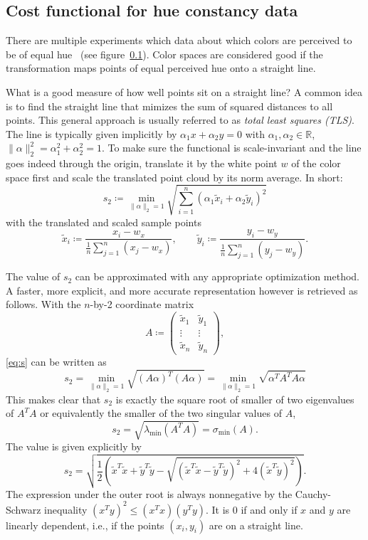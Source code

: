 \documentclass{scrartcl}
\theoremstyle{named}
\newcommand\R{\ensuremath{\mathbb{R}}}
\begin{document}
\subsection{Cost functional for hue constancy data}

There are multiple experiments which data about which colors are perceived to be of
equal hue~\cite{ebner,xiao,hung} (see figure~\ref{}). Color spaces are considered good
if the transformation maps points of equal perceived hue onto a straight line.

What is a good measure of how well points sit on a straight line?
A common idea is to find the straight line that mimizes the sum of squared distances to
all points. This general approach is usually referred to as \emph{total least squares
(TLS)}.
The line is typically given implicitly by $\alpha_1 x + \alpha_2 y
= 0$ with $\alpha_1,\alpha_2\in\R$, $\|\alpha\|_2^2 = \alpha_1^2 + \alpha_2^2 = 1$.
To make sure the functional is scale-invariant and the line goes indeed through the
origin, translate it by the white point $w$ of the color space first and scale the
translated point cloud by its norm average.
In short:
\begin{equation}\label{eq:s}
s_2 \coloneqq
\min_{\|\alpha\|_2=1}
  \sqrt{\sum_{i=1}^n (\alpha_1 \tilde{x}_i + \alpha_2 \tilde{y}_i)^2}
\end{equation}
with the translated and scaled sample points
\[
  \tilde{x}_i \coloneqq \frac{x_i-w_x}{\frac{1}{n}\sum_{j=1}^n (x_j-w_x)},\qquad
  \tilde{y}_i \coloneqq \frac{y_i-w_y}{\frac{1}{n}\sum_{j=1}^n (y_j-w_y)}.
\]

The value of $s_2$ can be approximated with any appropriate optimization method. A
faster, more explicit, and more accurate representation however is retrieved as follows.
With the $n$-by-2 coordinate matrix
\[
  A \coloneqq \begin{pmatrix}
    \tilde{x}_1 & \tilde{y}_1\\
    \vdots & \vdots\\
    \tilde{x}_n & \tilde{y}_n
  \end{pmatrix},
\]
\eqref{eq:s} can be written as
\[
  s_2
  = \min_{\|\alpha\|_2=1} \sqrt{(A \alpha)^T (A \alpha)}
  = \min_{\|\alpha\|_2=1} \sqrt{\alpha^T A^T A \alpha}
\]
This makes clear that $s_2$ is exactly the square root of smaller of two eigenvalues of
$A^TA$ or equivalently the smaller of the two singular values of $A$,
\[
s_2
= \sqrt{\lambda_{\min}(A^T A)}
= \sigma_{\min}(A).
\]
The value is given explicitly by
\begin{equation}\label{eq:s2}
  s_2 = \sqrt{
    \frac{1}{2} \left(
      \tilde{x}^T\tilde{x}
      + \tilde{y}^T\tilde{y}
      - \sqrt{(\tilde{x}^T\tilde{x} - \tilde{y}^T\tilde{y})^2 + 4 (\tilde{x}^T\tilde{y})^2}
      \right)
    }.
\end{equation}
The expression under the outer root is always nonnegative by the Cauchy-Schwarz
inequality $(x^Ty)^2 \le (x^Tx) (y^Ty)$. It is 0 if and only if $x$ and $y$ are linearly
dependent, i.e., if the points $(x_i, y_i)$ are on a straight line.
\end{document}
